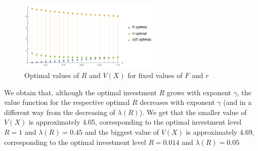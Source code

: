 \begin{figure}[!htb]
	\centering
	\includegraphics[width=0.6\textwidth]{Prob1_MaxProb/RVlambda_opt05.PNG}
	\caption{Optimal values of $R$ and $V(X)$ for fixed values of $F$ and $r$}
\end{figure}

We obtain that, although the optimal investment $R$ grows with exponent $\gamma$, the value function for the respective optimal $R$ decreases with exponent $\gamma$ (and in a different way from the decreasing of $\lambda(R)$). We get that the smaller value of $V(X)$ is approximately 4.05, corresponding to the optimal investment level $R=1$ and $\lambda(R)=0.45$ and the biggest value of $V(X)$ is approximately 4.69, corresponding to the optimal investment level $R=0.014$ and $\lambda(R)=0.05$